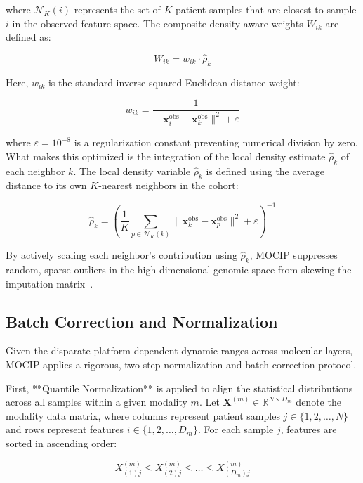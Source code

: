 \documentclass[12pt,a4paper,onecolumn]{article}
\begin{document}
where $\mathcal{N}_K(i)$ represents the set of $K$ patient samples that are closest to sample $i$ in the observed feature space. The composite density-aware weights $W_{ik}$ are defined as:

\begin{equation}
W_{ik} = w_{ik} \cdot \hat{\rho}_k
\end{equation}

Here, $w_{ik}$ is the standard inverse squared Euclidean distance weight:

\begin{equation}
w_{ik} = \frac{1}{\|\mathbf{x}_i^{\text{obs}} - \mathbf{x}_k^{\text{obs}}\|^2 + \varepsilon}
\end{equation}

where $\varepsilon = 10^{-8}$ is a regularization constant preventing numerical division by zero. What makes this optimized is the integration of the local density estimate $\hat{\rho}_k$ of each neighbor $k$. The local density variable $\hat{\rho}_k$ is defined using the average distance to its own $K$-nearest neighbors in the cohort:

\begin{equation}
\hat{\rho}_k = \left( \frac{1}{K} \sum_{p \in \mathcal{N}_K(k)} \|\mathbf{x}_k^{\text{obs}} - \mathbf{x}_p^{\text{obs}}\|^2 + \varepsilon \right)^{-1}
\end{equation}

By actively scaling each neighbor's contribution using $\hat{\rho}_k$, MOCIP suppresses random, sparse outliers in the high-dimensional genomic space from skewing the imputation matrix~\cite{troyanskaya2001}.


\subsection{Batch Correction and Normalization}
Given the disparate platform-dependent dynamic ranges across molecular layers, MOCIP applies a rigorous, two-step normalization and batch correction protocol.

First, **Quantile Normalization** is applied to align the statistical distributions across all samples within a given modality $m$. Let $\mathbf{X}^{(m)} \in \mathbb{R}^{N \times D_m}$ denote the modality data matrix, where columns represent patient samples $j \in \{1, 2, \dots, N\}$ and rows represent features $i \in \{1, 2, \dots, D_m\}$. For each sample $j$, features are sorted in ascending order:

\begin{equation}
X^{(m)}_{(1)j} \le X^{(m)}_{(2)j} \le \dots \le X^{(m)}_{(D_m)j}
\end{equation}
\end{document}
